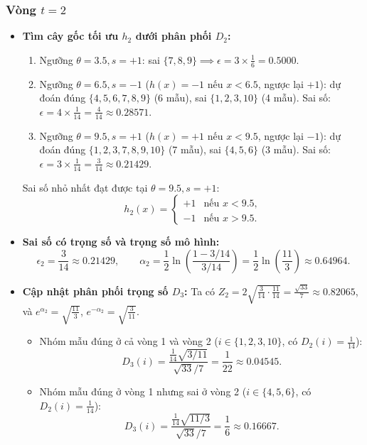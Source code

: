 \documentclass[11pt, a4paper]{article}
\begin{document}
\subsubsection*{Vòng $t = 2$}
\begin{itemize}
    \item \textbf{Tìm cây gốc tối ưu $h_2$ dưới phân phối $D_2$:}
    \begin{enumerate}
        \item Ngưỡng $\theta = 3.5, s = +1$: sai $\{7, 8, 9\} \implies \epsilon = 3 \times \frac{1}{6} = 0.5000$.
        \item Ngưỡng $\theta = 6.5, s = -1$ ($h(x) = -1$ nếu $x < 6.5$, ngược lại $+1$): dự đoán đúng $\{4, 5, 6, 7, 8, 9\}$ (6 mẫu), sai $\{1, 2, 3, 10\}$ (4 mẫu). Sai số: $\epsilon = 4 \times \frac{1}{14} = \frac{4}{14} \approx 0.28571$.
        \item Ngưỡng $\theta = 9.5, s = +1$ ($h(x) = +1$ nếu $x < 9.5$, ngược lại $-1$): dự đoán đúng $\{1, 2, 3, 7, 8, 9, 10\}$ (7 mẫu), sai $\{4, 5, 6\}$ (3 mẫu). Sai số: $\epsilon = 3 \times \frac{1}{14} = \frac{3}{14} \approx 0.21429$.
    \end{enumerate}
    Sai số nhỏ nhất đạt được tại $\theta = 9.5, s = +1$:
    \[
    h_2(x) = \begin{cases} +1 & \text{nếu } x < 9.5, \\ -1 & \text{nếu } x > 9.5. \end{cases}
    \]
    \item \textbf{Sai số có trọng số và trọng số mô hình:}
    \[
    \epsilon_2 = \frac{3}{14} \approx 0.21429, \qquad \alpha_2 = \frac{1}{2}\ln\left(\frac{1 - 3/14}{3/14}\right) = \frac{1}{2}\ln\left(\frac{11}{3}\right) \approx 0.64964.
    \]
    \item \textbf{Cập nhật phân phối trọng số $D_3$:}
    Ta có $Z_2 = 2\sqrt{\frac{3}{14} \cdot \frac{11}{14}} = \frac{\sqrt{33}}{7} \approx 0.82065$, và $e^{\alpha_2} = \sqrt{\frac{11}{3}}$, $e^{-\alpha_2} = \sqrt{\frac{3}{11}}$.
    \begin{itemize}
        \item Nhóm mẫu đúng ở cả vòng 1 và vòng 2 ($i \in \{1, 2, 3, 10\}$, có $D_2(i) = \frac{1}{14}$):
        \[
        D_3(i) = \frac{\frac{1}{14} \sqrt{3/11}}{\sqrt{33}/7} = \frac{1}{22} \approx 0.04545.
        \]
        \item Nhóm mẫu đúng ở vòng 1 nhưng sai ở vòng 2 ($i \in \{4, 5, 6\}$, có $D_2(i) = \frac{1}{14}$):
        \[
        D_3(i) = \frac{\frac{1}{14} \sqrt{11/3}}{\sqrt{33}/7} = \frac{1}{6} \approx 0.16667.
\]
\end{itemize}
\end{itemize}
\end{document}
